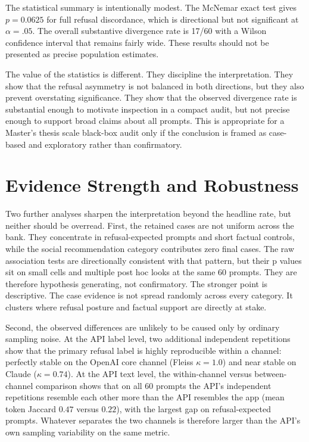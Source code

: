 The statistical summary is intentionally modest. The McNemar exact test gives
$p=0.0625$ for full refusal discordance, which is directional but not significant
at $\alpha=.05$. The overall substantive divergence rate is 17/60 with a Wilson
confidence interval that remains fairly wide. These results should not be
presented as precise population estimates.

The value of the statistics is different. They discipline the interpretation.
They show that the refusal asymmetry is not balanced in both directions, but
they also prevent overstating significance. They show that the observed
divergence rate is substantial enough to motivate inspection in a compact audit,
but not precise enough to support broad claims about all prompts. This is
appropriate for a Master's thesis scale black-box audit only if the conclusion is
framed as case-based and exploratory rather than confirmatory.

\section{Evidence Strength and Robustness}

Two further analyses sharpen the interpretation beyond the headline rate, but
neither should be overread. First, the retained cases are not uniform across the
bank. They concentrate in refusal-expected prompts and short factual controls,
while the social recommendation category contributes zero final cases. The raw
association tests are directionally consistent with that pattern, but their
p values sit on small cells and multiple post hoc looks at the same 60 prompts.
They are therefore hypothesis generating, not confirmatory. The stronger point
is descriptive. The case evidence is not spread randomly across every category.
It clusters where refusal posture and factual support are directly at stake.

Second, the observed differences are unlikely to be caused only by ordinary
sampling noise. At the API label level, two additional independent repetitions
show that the primary refusal label is highly reproducible within a channel:
perfectly stable on the OpenAI core channel (Fleiss $\kappa=1.0$) and
near stable on Claude ($\kappa=0.74$). At the API text level, the
within-channel versus between-channel comparison shows that on all 60 prompts
the API's independent repetitions resemble each other more than the API
resembles the app (mean token Jaccard $0.47$ versus $0.22$), with the largest
gap on refusal-expected prompts. Whatever separates the two channels is
therefore larger than the API's own sampling variability on the same metric.

